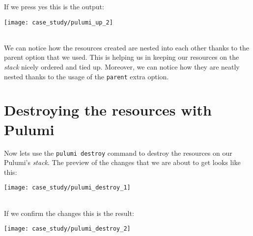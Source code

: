 If we press yes this is the output:
\begin{center}
  \texttt{[image: case\_study/pulumi\_up\_2]} 
\end{center}\mbox{}\\
We can notice how the resources created are nested into each other thanks to the parent option that we used.
This is helping us in keeping our resources on the \textit{stack} nicely ordered and tied up.
Moreover, we can notice how they are neatly nested thanks to the usage of the \texttt{parent} extra option.\\

\section{Destroying the resources with Pulumi}
Now lets use the \texttt{pulumi destroy} command to destroy the resources on our Pulumi's \textit{stack}.
The preview of the changes that we are about to get looks like this:
\begin{center}
  \texttt{[image: case\_study/pulumi\_destroy\_1]} 
\end{center}\mbox{}\\

If we confirm the changes this is the result:
\begin{center}
  \texttt{[image: case\_study/pulumi\_destroy\_2]} 
\end{center}\mbox{}\\


